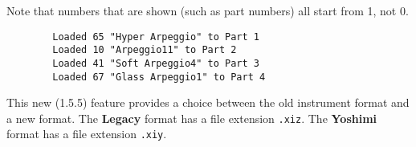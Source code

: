    Note that numbers that are shown (such as part numbers) all start from 1,
   not 0.

   \begin{verbatim}
		Loaded 65 "Hyper Arpeggio" to Part 1
		Loaded 10 "Arpeggio11" to Part 2
		Loaded 41 "Soft Arpeggio4" to Part 3
		Loaded 67 "Glass Arpeggio1" to Part 4
   \end{verbatim}





   This new (1.5.5) feature provides a choice between the old instrument format
   and a new format.
   The \textbf{Legacy} format has a file extension \texttt{.xiz}.
   The \textbf{Yoshimi} format has a file extension \texttt{.xiy}.

